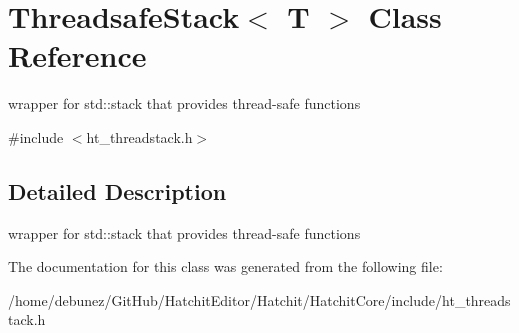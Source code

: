 \hypertarget{classThreadsafeStack_3_01T_01_4}{}\section{Threadsafe\+Stack$<$ T $>$ Class Reference}
\label{classThreadsafeStack_3_01T_01_4}


wrapper for std\+::stack that provides thread-\/safe functions  




{\ttfamily \#include $<$ht\+\_\+threadstack.\+h$>$}



\subsection{Detailed Description}
wrapper for std\+::stack that provides thread-\/safe functions 

The documentation for this class was generated from the following file\+:\begin{DoxyCompactItemize}
\item 
/home/debunez/\+Git\+Hub/\+Hatchit\+Editor/\+Hatchit/\+Hatchit\+Core/include/ht\+\_\+threadstack.\+h\end{DoxyCompactItemize}
